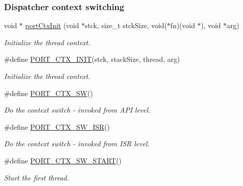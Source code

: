 \subsubsection*{Dispatcher context switching}
\begin{DoxyCompactItemize}
\item 
void $\ast$ \hyperlink{group__template__cpu__intf_gaa097ec2ead487892969bcd2806539822}{port\-Ctx\-Init} (void $\ast$stck, size\-\_\-t stck\-Size, void($\ast$fn)(void $\ast$), void $\ast$arg)
\begin{DoxyCompactList}\small\item\em Initialize the thread context. \end{DoxyCompactList}\item 
\#define \hyperlink{group__template__cpu__intf_ga80d15a56d61c9d4e786e52006ff4ac43}{P\-O\-R\-T\-\_\-\-C\-T\-X\-\_\-\-I\-N\-I\-T}(stck, stack\-Size, thread, arg)
\begin{DoxyCompactList}\small\item\em Initialize the thread context. \end{DoxyCompactList}\item 
\#define \hyperlink{group__template__cpu__intf_ga50a3b72a7f2065922811f0d6dedda01a}{P\-O\-R\-T\-\_\-\-C\-T\-X\-\_\-\-S\-W}()
\begin{DoxyCompactList}\small\item\em Do the context switch -\/ invoked from A\-P\-I level. \end{DoxyCompactList}\item 
\#define \hyperlink{group__template__cpu__intf_ga20bba8f9c5a2f38fd7c63b9d2320e511}{P\-O\-R\-T\-\_\-\-C\-T\-X\-\_\-\-S\-W\-\_\-\-I\-S\-R}()
\begin{DoxyCompactList}\small\item\em Do the context switch -\/ invoked from I\-S\-R level. \end{DoxyCompactList}\item 
\#define \hyperlink{group__template__cpu__intf_ga58056289ebeda87723f99f5431c6239e}{P\-O\-R\-T\-\_\-\-C\-T\-X\-\_\-\-S\-W\-\_\-\-S\-T\-A\-R\-T}()
\begin{DoxyCompactList}\small\item\em Start the first thread. \end{DoxyCompactList}\end{DoxyCompactItemize}
